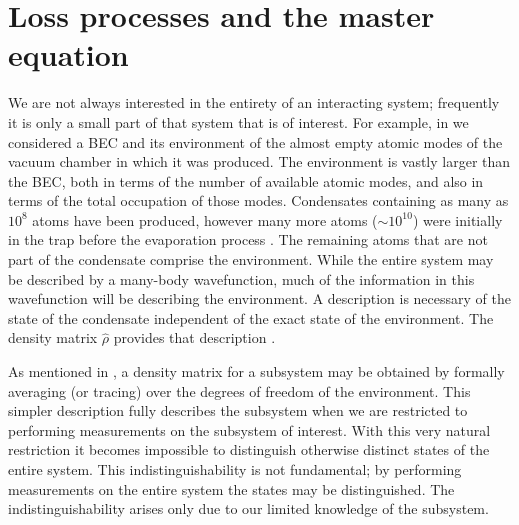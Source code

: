 \section{Loss processes and the master equation}

We are not always interested in the entirety of an interacting system; frequently it is only a small part of that system that is of interest.  For example, in  we considered a BEC and its environment of the almost empty atomic modes of the vacuum chamber in which it was produced.  The environment is vastly larger than the BEC, both in terms of the number of available atomic modes, and also in terms of the total occupation of those modes.  Condensates containing as many as $10^8$  atoms have been produced, however many more atoms ($\sim 10^{10}$) were initially in the trap before the evaporation process \citep{Streed:2006}.  The remaining atoms that are not part of the condensate comprise the environment.  While the entire system may be described by a many-body wavefunction, much of the information in this wavefunction will be describing the environment.  A description is necessary of the state of the condensate independent of the exact state of the environment.  The density matrix $\hat{\rho}$ provides that description \citep{Scully}.

As mentioned in , a density matrix for a subsystem may be obtained by formally averaging (or tracing) over the degrees of freedom of the environment.  This simpler description fully describes the subsystem when we are restricted to performing measurements on the subsystem of interest.  With this very natural restriction it becomes impossible to distinguish otherwise distinct states of the entire system.  This indistinguishability is not fundamental; by performing measurements on the entire system the states may be distinguished.  The indistinguishability arises only due to our limited knowledge of the subsystem.

